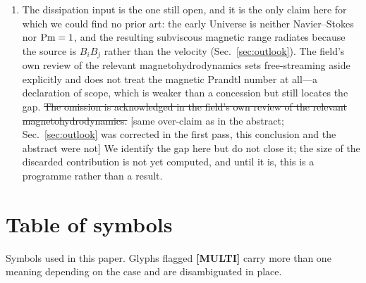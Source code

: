 \documentclass[10pt,prd,aps,nobibnotes,superscriptaddress,preprintnumbers,notitlepage]{revtex4-1}
\newcommand{\add}[1]{{\color{red}#1}}
\newcommand{\del}[1]{{\color{red}\sout{#1}}}
\newcommand{\why}[1]{{\color{red}\footnotesize\textsf{[#1]}}}
\newcommand{\add}[1]{#1}
\newcommand{\del}[1]{}
\newcommand{\why}[1]{}
\begin{document}
\begin{enumerate}
  \item The dissipation input is the one still open, and it is the only claim here
  for which we could find no prior art: the early Universe is neither
  Navier--Stokes nor ${\rm Pm}=1$, and the resulting subviscous magnetic range
  radiates because the source is $B_iB_j$ rather than the velocity
  (Sec.~\ref{sec:outlook}). \add{The field's own review of the relevant
  magnetohydrodynamics \cite{RoperPol:2025lgc} sets free-streaming aside explicitly
  and does not treat the magnetic Prandtl number at all---a declaration of scope, which
  is weaker than a concession but still locates the gap.}
  \del{The omission is acknowledged in the field's own review
  of the relevant magnetohydrodynamics.}
  \why{same over-claim as in the abstract; Sec.~\ref{sec:outlook} was corrected in the
  first pass, this conclusion and the abstract were not}
  We identify the gap
  here but do not close it; the size of the discarded contribution is not yet
  computed, and until it is, this is a programme rather than a result.
\end{enumerate}

\appendix

\section{Table of symbols}
\label{sec:symbols}

Symbols used in this paper. Glyphs flagged \textbf{[MULTI]} carry more than one
meaning depending on the case and are disambiguated in place.
\label{tab:variables}

\begingroup
\renewcommand{\arraystretch}{1.25}
\end{document}
